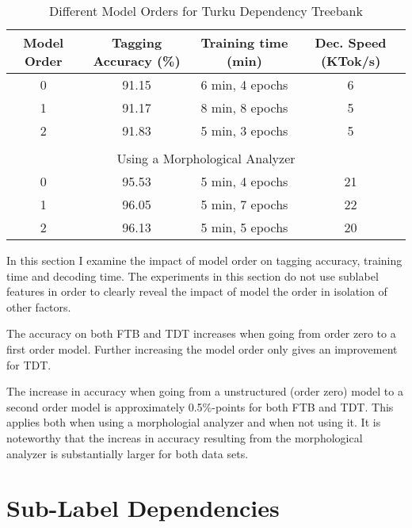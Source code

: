 \begin{table}[htb!]
\begin{center}
\begin{tabular}{cccc}
Model Order & Tagging Accuracy (\%) & Training time (min) & Dec. Speed (KTok/s)\\
\hline
0        & 91.15            & 6 min, 4 epochs            & 6            \\
1        & 91.17            & 8 min, 8 epochs            & 5            \\
2        & 91.83            & 5 min, 3 epochs            & 5            \\
                &                       &                  &            \\
\multicolumn{4}{c}{Using a Morphological Analyzer}\\
\hline
0        & 95.53            & 5 min, 4 epochs            & 21            \\
1        & 96.05            & 5 min, 7 epochs            & 22            \\
2        & 96.13            & 5 min, 5 epochs            & 20            \\

\end{tabular}
\caption{Different Model Orders for Turku Dependency Treebank}
\end{center}
\end{table}

In this section I examine the impact of model order on tagging
accuracy, training time and decoding time. The experiments in this
section do not use sublabel features in order to clearly reveal the
impact of model the order in isolation of other factors.

The accuracy on both FTB and TDT increases when going from order zero
to a first order model. Further increasing the model order only gives
an improvement for TDT.

The increase in accuracy when going from a unstructured (order zero)
model to a second order model is approximately 0.5\%-points for both
FTB and TDT. This applies both when using a morphologial analyzer and
when not using it. It is noteworthy that the increas in accuracy
resulting from the morphological analyzer is substantially larger for
both data sets.

\section{Sub-Label Dependencies}

